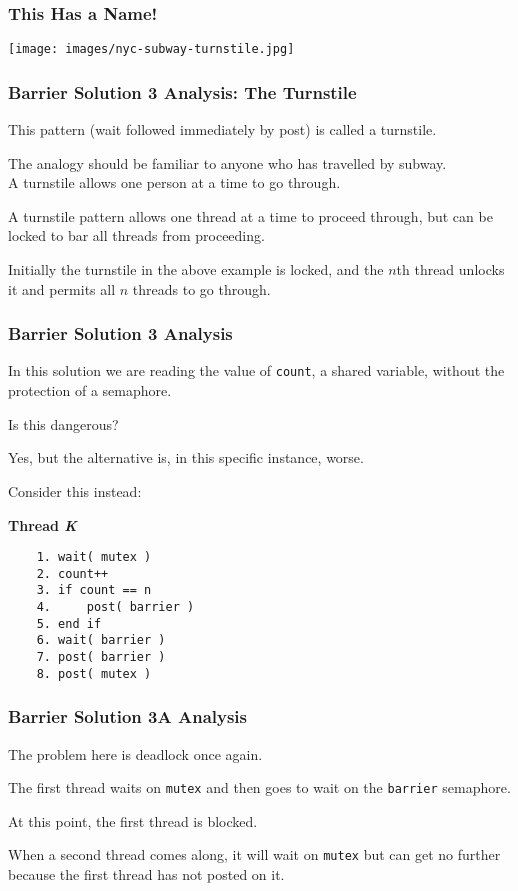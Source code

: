 \begin{frame}
	\frametitle{This Has a Name!}
	\begin{center}
		\texttt{[image: images/nyc-subway-turnstile.jpg]}
	\end{center}

\end{frame}


\begin{frame}
	\frametitle{Barrier Solution 3 Analysis: The Turnstile}

	This pattern (wait followed immediately by post) is called a \alert{turnstile}.

	The analogy should be familiar to anyone who has travelled by subway.\\
	\quad A turnstile allows one person at a time to go through.

	A turnstile pattern allows one thread at a time to proceed through, but can be locked to bar all threads from proceeding.

	Initially the turnstile in the above example is locked, and the $n$th thread unlocks it and permits all $n$ threads to go through.

\end{frame}

\begin{frame}[fragile]
	\frametitle{Barrier Solution 3 Analysis}

	In this solution we are reading the value of \texttt{count}, a shared variable, without the protection of a semaphore.

	Is this dangerous?

	Yes, but the alternative is, in this specific instance, worse.

	Consider this instead:

	\textbf{Thread \textit{K}}\vspace{-2em}
	\begin{verbatim}
	1. wait( mutex )
	2. count++
	3. if count == n
	4.     post( barrier )
	5. end if
	6. wait( barrier )
	7. post( barrier )
	8. post( mutex )
  \end{verbatim}
	\vspace{-2em}

\end{frame}

\begin{frame}
	\frametitle{Barrier Solution 3A Analysis}

	The problem here is deadlock once again.

	The first thread waits on \texttt{mutex} and then goes to wait on the \texttt{barrier} semaphore.

	At this point, the first thread is blocked.

	When a second thread comes along, it will wait on \texttt{mutex} but can get no further because the first thread has not posted on it.


\end{frame}

